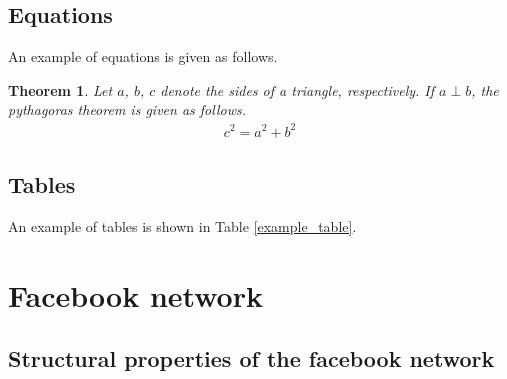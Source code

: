 \documentclass[11pt]{article}
\newtheorem{theorem}{Theorem}
\begin{document}
\subsection{Equations}
An example of equations is given as follows.
\begin{theorem}
Let $a$, $b$, $c$ denote the sides of a triangle, respectively. If $a\perp b$, the pythagoras theorem is given as follows.
\begin{align}
c^2 = a^2 + b^2
\end{align}
\end{theorem}

\subsection{Tables}
An example of tables is shown in Table \ref{example_table}.
\renewcommand\arraystretch{1.1}
\begin{table}[h]
\center
\caption{Standard CRC Codes versus Optimal CRC Codes for Convolutional Code $G=(561~753)$ with $n=504$ Bits}
\label{example_table}
\end{table}


\section{Facebook network}


\subsection{Structural properties of the facebook network}
\end{document}
